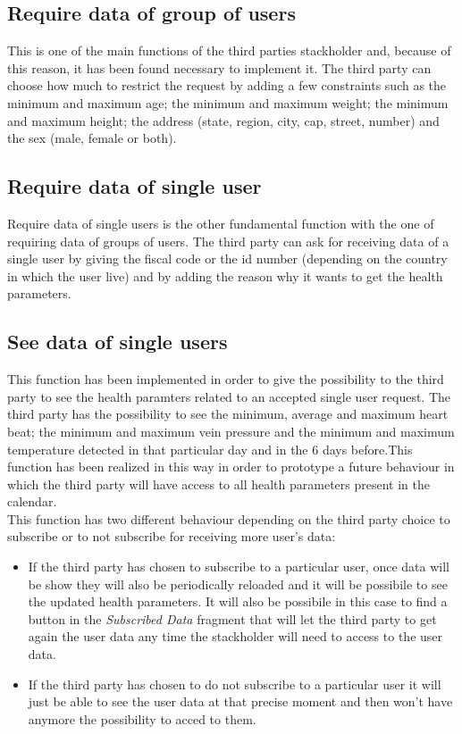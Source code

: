 \subsection{Require data of group of users}
This is one of the main functions of the third parties stackholder and, because of this reason, it has been found necessary to implement it. The third party can choose how much to restrict the request by adding a few constraints such as the minimum and maximum age; the minimum and maximum weight; the minimum and maximum height; the address (state, region, city, cap, street, number) and the sex (male, female or both).

\subsection{Require data of single user}
Require data of single users is the other fundamental function  with the one of requiring data of groups of users. The third party can ask for receiving  data of a single user by giving the fiscal code or the id number (depending on the country in which the user live) and by adding the reason why it wants to get the health parameters.

\subsection{See data of single users}
This function has been implemented in order to give the possibility to the third party to see the health paramters related to an accepted single user request. The third party has the possibility to see the minimum, average and maximum heart beat; the minimum and maximum vein pressure and the minimum and maximum temperature detected in that particular day and in the 6 days before.This function has been realized in this way in order to prototype a future behaviour in which the third party will have access to all health parameters present in the calendar.\\
This function has two different behaviour depending on the third party choice to subscribe or to not subscribe for receiving more user's data:
\begin{itemize}
	\item If the third party has chosen to subscribe to a particular user, once data will be show they will also be periodically 				reloaded and it will be possibile to see the updated health parameters. It will also be possibile in this case to find a button in the 	\textit{Subscribed Data} fragment that will let the third party to get again the user data any time the stackholder will need to 			access to the user data.
	\item If the third party has chosen to do not subscribe to a particular user it will just be able to see the user data at that precise 		moment and then won't have anymore the possibility to acced to them.
\end{itemize}

